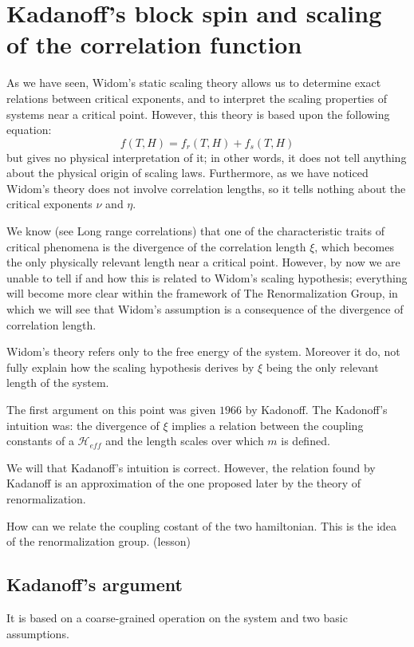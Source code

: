 \documentclass[../main/main.tex]{subfiles}
\begin{document}
\section{Kadanoff's block spin and scaling of the correlation function}
As we have seen, Widom's static scaling theory allows us to determine exact relations between critical exponents, and to interpret the scaling properties of systems near a critical point. However, this theory is based upon the following equation:
\begin{equation*}
  f (T,H) = f_r (T,H) + f_s(T,H)
\end{equation*}
but gives no physical interpretation of it; in other words, it does not tell anything about the physical origin of scaling laws. Furthermore, as we have noticed Widom's theory does not involve correlation lengths, so it tells nothing about the critical exponents \( \nu  \)  and \( \eta  \).



We know (see Long range correlations) that one of the characteristic traits of critical phenomena is the divergence of the correlation length \( \xi  \), which becomes the only physically relevant length near a critical point. However, by now we are unable to tell if and how this is related to Widom's scaling hypothesis; everything will become more clear within the framework of The Renormalization Group, in which we will see that Widom's assumption is a consequence of the divergence of correlation length.

Widom's theory refers only to the free energy of the system. Moreover it do, not fully explain how the scaling hypothesis derives by \( \xi  \) being the only relevant length of the system.

The first argument on this point was given \( 1966 \) by Kadonoff.
The Kadonoff's intuition was: the divergence of \( \xi  \) implies a relation between the coupling constants of a \( \mathcal{H}_{eff} \) and the length scales over which \( m \) is defined.

We will that Kadanoff's intuition is correct. However, the relation found by Kadanoff is an approximation of the one proposed later by the theory of renormalization.
\begin{remark}
How can we relate the coupling costant of the two hamiltonian. This is the idea of the renormalization group. (lesson)
\end{remark}
\subsection{Kadanoff's argument}
It is based on a coarse-grained operation on the system and two basic assumptions.
\end{document}
